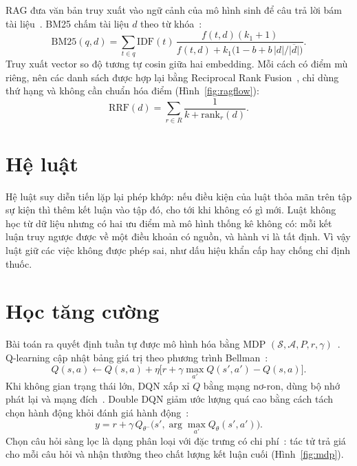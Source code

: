 
RAG đưa văn bản truy xuất vào ngữ cảnh của mô hình sinh để câu trả lời bám tài liệu~\cite{rag}. BM25 chấm tài liệu $d$ theo từ khóa~\cite{bm25}:
\begin{equation}
\mathrm{BM25}(q,d)=\sum_{t\in q}\mathrm{IDF}(t)\,\frac{f(t,d)(k_1+1)}{f(t,d)+k_1\big(1-b+b\,|d|/\overline{|d|}\big)}.
\end{equation}
Truy xuất vector so độ tương tự cosin giữa hai embedding. Mỗi cách có điểm mù riêng, nên các danh sách được hợp lại bằng Reciprocal Rank Fusion~\cite{rrf}, chỉ dùng thứ hạng và không cần chuẩn hóa điểm (Hình~\ref{fig:ragflow}):
\begin{equation}
\mathrm{RRF}(d)=\sum_{r\in R}\frac{1}{k+\mathrm{rank}_r(d)}.
\end{equation}


\section{Hệ luật}

Hệ luật suy diễn tiến lặp lại phép khớp: nếu điều kiện của luật thỏa mãn trên tập sự kiện thì thêm kết luận vào tập đó, cho tới khi không có gì mới. Luật không học từ dữ liệu nhưng có hai ưu điểm mà mô hình thống kê không có: mỗi kết luận truy ngược được về một điều khoản có nguồn, và hành vi là tất định. Vì vậy luật giữ các việc không được phép sai, như dấu hiệu khẩn cấp hay chống chỉ định thuốc.

\section{Học tăng cường}

Bài toán ra quyết định tuần tự được mô hình hóa bằng MDP $(\mathcal{S},\mathcal{A},P,r,\gamma)$~\cite{sutton}. Q-learning cập nhật bảng giá trị theo phương trình Bellman~\cite{qlearning}:
\begin{equation}
Q(s,a)\leftarrow Q(s,a)+\eta\big[r+\gamma\max_{a'}Q(s',a')-Q(s,a)\big].
\end{equation}
Khi không gian trạng thái lớn, DQN xấp xỉ $Q$ bằng mạng nơ-ron, dùng bộ nhớ phát lại và mạng đích~\cite{dqn}. Double DQN giảm ước lượng quá cao bằng cách tách chọn hành động khỏi đánh giá hành động~\cite{ddqn}:
\begin{equation}
y=r+\gamma\,Q_{\theta^-}\big(s',\arg\max_{a'}Q_{\theta}(s',a')\big).
\end{equation}
Chọn câu hỏi sàng lọc là dạng phân loại với đặc trưng có chi phí~\cite{costly}: tác tử trả giá cho mỗi câu hỏi và nhận thưởng theo chất lượng kết luận cuối (Hình~\ref{fig:mdp}).

